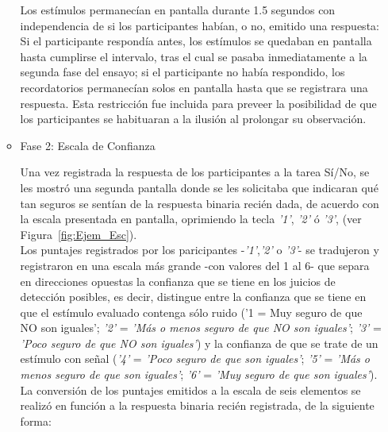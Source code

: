 \begin{itemize}
\begin{itemize}
Los estímulos permanecían en pantalla durante 1.5 segundos con independencia de si los participantes habían, o no, emitido una respuesta: Si el participante respondía antes, los estímulos se quedaban en pantalla hasta cumplirse el intervalo, tras el cual se pasaba inmediatamente a la segunda fase del ensayo; si el participante no había respondido, los recordatorios permanecían solos en pantalla hasta que se registrara una respuesta. Esta restricción fue incluida para preveer la posibilidad de que los participantes se habituaran a la ilusión al prolongar su observación.\\

\item Fase 2: Escala de Confianza

Una vez registrada la respuesta de los participantes a la tarea Sí/No, se les mostró una segunda pantalla donde se les solicitaba que indicaran qué tan seguros se sentían de la respuesta binaria recién dada, de acuerdo con la escala presentada en pantalla, oprimiendo la tecla \textit{'1'}, \textit{'2'} ó \textit{'3'}, (ver Figura~\ref{fig:Ejem_Esc}). \\

Los puntajes registrados por los paricipantes -\textit{'1'},\textit{'2'} o \textit{'3'}- se tradujeron y registraron en una escala más grande -con valores del 1 al 6- que separa en direcciones opuestas la confianza que se tiene en los juicios de detección posibles, es decir, distingue entre la confianza que se tiene en que el estímulo evaluado contenga sólo ruido ('1 = Muy seguro de que NO son iguales'; \textit{'2'} =  \textit{'Más o menos seguro de que NO son iguales'}; \textit{'3'} = \textit{'Poco seguro de que NO son iguales'}) y la confianza de que se trate de un estímulo con señal (\textit{'4'} = \textit{'Poco seguro de que son iguales'}; \textit{'5'} = \textit{'Más o menos seguro de que son iguales'}; \textit{'6'} = \textit{'Muy seguro de que son iguales'}). La conversión de los puntajes emitidos a la escala de seis elementos se realizó en función a la respuesta binaria recién registrada, de la siguiente forma:


\end{itemize}
\end{itemize}
